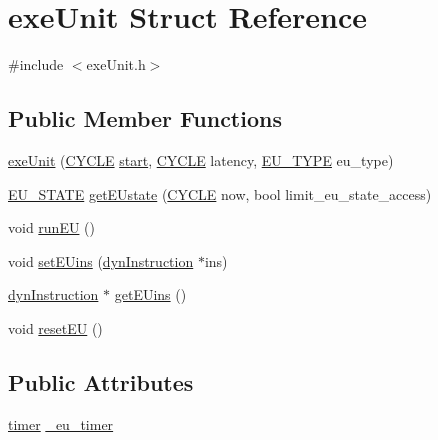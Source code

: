 \hypertarget{structexeUnit}{
\section{exeUnit Struct Reference}
\label{structexeUnit}
}


{\ttfamily \#include $<$exeUnit.h$>$}

\subsection*{Public Member Functions}
\begin{DoxyCompactItemize}
\item 
\hyperlink{structexeUnit_af9048405bad98db15cdefb05bf7b842c}{exeUnit} (\hyperlink{global_2global_8h_a7e19a550ec11d1ed921deb20c22efb5b}{CYCLE} \hyperlink{bkEnd_8cpp_ada310e7f72b38fadd4b24d80ed3438ee}{start}, \hyperlink{global_2global_8h_a7e19a550ec11d1ed921deb20c22efb5b}{CYCLE} latency, \hyperlink{exeUnit_8h_a8184e36081fa22a84c7488c1eaeb0f5d}{EU\_\-TYPE} eu\_\-type)
\item 
\hyperlink{exeUnit_8h_ac578f59a761f9106ba1a8414e02ab6d8}{EU\_\-STATE} \hyperlink{structexeUnit_a739cfd78a98068a64fb2e807f49c4312}{getEUstate} (\hyperlink{global_2global_8h_a7e19a550ec11d1ed921deb20c22efb5b}{CYCLE} now, bool limit\_\-eu\_\-state\_\-access)
\item 
void \hyperlink{structexeUnit_a69498b2ca8353a14447a5596e768fc55}{runEU} ()
\item 
void \hyperlink{structexeUnit_ad9a4840a6956e01419327ba3123683dd}{setEUins} (\hyperlink{classdynInstruction}{dynInstruction} $\ast$ins)
\item 
\hyperlink{classdynInstruction}{dynInstruction} $\ast$ \hyperlink{structexeUnit_a5414837e2e071fc0180c0326cc33370f}{getEUins} ()
\item 
void \hyperlink{structexeUnit_a31fd51a344347d96c9be688de8e0f97a}{resetEU} ()
\end{DoxyCompactItemize}
\subsection*{Public Attributes}
\begin{DoxyCompactItemize}
\item 
\hyperlink{structtimer}{timer} \hyperlink{structexeUnit_a5dc187ea49bad94bbea24f18232500dd}{\_\-eu\_\-timer}
\end{DoxyCompactItemize}


